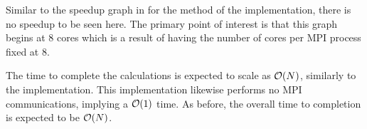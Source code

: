 %

%
%
\begin{figure}[!h]
    
    \caption{
        \vZeroSpeedupCaption
            {\sharedandreplicateddata{}}
            {\individualoperation{}}
    }
    \label{fig:v1_shared_and_replicated_data_individual_operation_speedups}
\end{figure}


\vZeroSpeedupExplanation
    {}
    {\sharedandreplicateddata{}}
    {\individualoperation{}}

Similar to the speedup graph in
for the \individualoperation{} method of the \replicateddata{}
implementation, there is no speedup to be seen here.
%
The primary point of interest is that this graph begins at 8 cores
which is a result of having the number of \openmp{} cores per
MPI process fixed at 8.

%
The time to complete the calculations is expected to scale as $\mathcal{O}{\left({ N }\right)}$,
similarly to the \replicateddata{} implementation.
%
This implementation likewise performs no MPI communications, implying a
$\mathcal{O}{\left({ 1 }\right)}$ time.
%
As before, the overall time to completion is expected to be $\mathcal{O}{\left({ N }\right)}$.

%
%
\begin{figure}[!h]
    
    \caption{}
    \label{fig:v1_shared_and_replicated_individual_operation_512_time}
\end  {figure}

\begin{figure}[!h]
    
    \caption{}
    \label{fig:v1_shared_and_replicated_individual_operation_4096_time}
\end  {figure}

